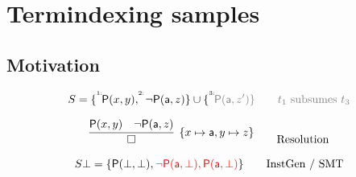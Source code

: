 
\section{Termindexing samples}
\subsection{Motivation}



\begin{example}
	\begin{gather*}
	S = \{ \TI{1}\mP(x,y), \TI{2}\lnot \mP(\ma,z)\} \cup \{\TI{3}\colG\mP(\ma,z') \}
	\tag*{$t_1$ subsumes $t_3$}
	\\[0.7em]
	\infer[\{x\mapsto\ma,y\mapsto z\}]
	{\square}
	{\mP(x,y) & \lnot \mP(\ma,z)}
	\tag*{Resolution}
	\\[0.7em]
	S\bot = \{ \mP(\bot,\bot), {\colLo\lnot \mP(\ma,\bot), \mP(\ma,\bot)} \}
	\tag*{InstGen / SMT}
	\end{gather*}
\end{example}


